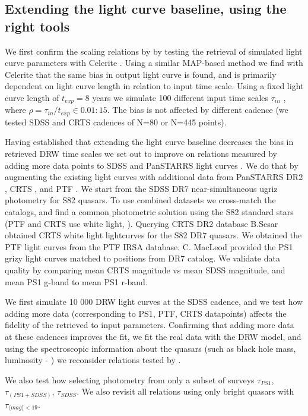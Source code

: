 \documentclass[modern]{aastex62}
\begin{document}
\subsection{Extending the light curve baseline, using the right tools}
We first confirm the scaling relations by \cite{kozlowski2017a} by testing the retrieval of simulated light curve parameters with Celerite .  Using a similar MAP-based method we find with Celerite that the same bias in output light curve is found, and is primarily dependent on light curve length in relation to input time scale. Using a fixed light curve length of $t_{exp} = 8$ years we simulate 100 different input time scales $\tau_{in}$ ,  where  $\rho = \tau_{in} / t_{exp} \in   { 0.01 : 15}$.  The bias is not affected by different cadence (we tested SDSS and CRTS cadences of N=80 or N=445 points).


Having established that extending the light curve baseline decreases the bias in retrieved DRW time scales we set out to improve on relations measured by \cite{macleod2011, hernitschek2016} adding more data points to SDSS and PanSTARRS light curves \citep{chambers2011}. We do that by augmenting the existing light curves with additional data from PanSTARRS DR2 \citep{flewelling2018} , CRTS \citep{drake2009}, and PTF \citep{rau2009}.  We start from the SDSS  DR7 near-simultaneous ugriz photometry for S82 quasars\citep{schneider2008}.  To use combined datasets we cross-match the catalogs, and find a common photometric solution using the S82 standard stars (PTF and CRTS use white light, \cite{djorgovski2011a}). Querying CRTS DR2 database B.Sesar obtained CRTS white light lightcurves for the S82 DR7 quasars.  We obtained the PTF light curves from the PTF IRSA database.  C. MacLeod provided  the PS1  grizy  light curves matched to positions from DR7 catalog.  We validate data quality by comparing mean CRTS magnitude vs mean SDSS magnitude, and mean PS1 g-band to mean PS1 r-band. 

We first simulate 10 000 DRW light curves at the SDSS cadence, and we test how adding more data (corresponding to PS1, PTF, CRTS datapoints) affects the fidelity of the retrieved to input parameters. Confirming that adding more data at these cadences improves the fit, we fit the real data with the DRW model, and using the spectroscopic information about the quasars (such as black hole mass, luminosity - \cite{kelly2013}) we reconsider relations tested by \cite{macleod2011}. 

We also test how selecting photometry from only a subset of surveys $\tau_{PS1}$, $\tau_{(PS1+SDSS)}$,  $\tau_{SDSS}$.  We also revisit all relations using only bright quasars with   $\tau_{\langle mag\rangle<19}$.
\end{document}
